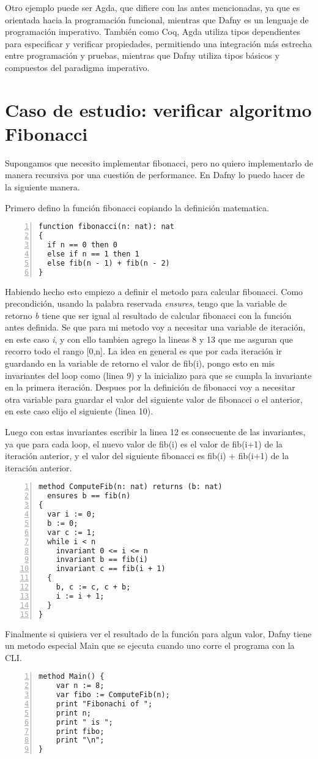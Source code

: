 \documentclass[runningheads]{llncs}
\begin{document}
Otro ejemplo puede ser Agda, que difiere con las antes mencionadas, ya que 
es orientada hacia la programación funcional, mientras que Dafny es un lenguaje de programación imperativo. 
También como Coq, Agda utiliza tipos dependientes para especificar y verificar propiedades, 
permitiendo una integración más estrecha entre programación y pruebas, mientras que Dafny utiliza tipos básicos y compuestos del paradigma imperativo.

\section{Caso de estudio: verificar algoritmo Fibonacci}
Supongamos que necesito implementar fibonacci, pero no quiero implementarlo de manera recursiva por una cuestión de performance. En Dafny lo puedo hacer de la siguiente manera.

Primero defino la función fibonacci copiando la definición matematica.
\begin{Verbatim}[numbers=left,xleftmargin=5mm]
function fibonacci(n: nat): nat
{
  if n == 0 then 0
  else if n == 1 then 1
  else fib(n - 1) + fib(n - 2)
}
\end{Verbatim}

Habiendo hecho esto empiezo a definir el metodo para calcular fibonacci.
Como precondición, usando la palabra reservada \textit{ensures}, tengo que la variable de retorno \textit{b} tiene que ser igual al resultado de calcular fibonacci con la función antes definida.
Se que para mi metodo voy a necesitar una variable de iteración, en este caso \textit{i}, y con ello tambien agrego la lineas 8 y 13 que me asguran que recorro todo el rango [0,n].
La idea en general es que por cada iteración ir guardando en la variable de retorno el valor de fib(i), pongo esto en mis invariantes del loop como (linea 9) y la inicializo para que se cumpla la invariante en la primera iteración. Despues por la definición de fibonacci voy a necesitar otra variable para guardar el valor del siguiente valor de fibonacci o el anterior, en este caso elijo el siguiente (linea 10).

Luego con estas invariantes escribir la linea 12 es consecuente de las invariantes, ya que para cada loop, el nuevo valor de fib(i) es el valor de fib(i+1) de la iteración anterior, y el valor del siguiente fibonacci es fib(i) + fib(i+1) de la iteración anterior.
\begin{Verbatim}[numbers=left,xleftmargin=5mm]
method ComputeFib(n: nat) returns (b: nat)
  ensures b == fib(n)
{
  var i := 0;
  b := 0;
  var c := 1;
  while i < n
    invariant 0 <= i <= n
    invariant b == fib(i)
    invariant c == fib(i + 1)
  {
    b, c := c, c + b;
    i := i + 1;
  }
}
\end{Verbatim}
Finalmente si quisiera ver el resultado de la función para algun valor, Dafny tiene un metodo especial Main que se ejecuta cuando uno corre el programa con la CLI.
\begin{Verbatim}[numbers=left,xleftmargin=5mm]
method Main() {
    var n := 8;
    var fibo := ComputeFib(n);
    print "Fibonachi of ";
    print n;
    print " is ";
    print fibo;
    print "\n";
}
\end{Verbatim}
\end{document}
